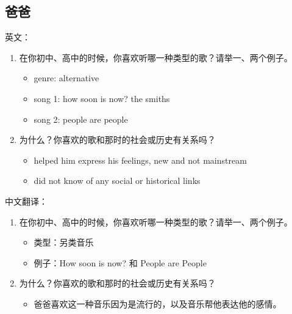 \documentclass[11pt]{article}
\begin{document}
\subsection{爸爸}
\label{sec:org5ee2cbc}
英文：
\begin{enumerate}
\item 在你初中、高中的时候，你喜欢听哪一种类型的歌？请举一、两个例子。
\begin{itemize}
\item genre: alternative
\item song 1: how soon is now? the smiths
\item song 2: people are people
\end{itemize}
\item 为什么？你喜欢的歌和那时的社会或历史有关系吗？
\begin{itemize}
\item helped him express his feelings, new and not mainstream
\item did not know of any social or historical links
\end{itemize}
\end{enumerate}
中文翻译：
\begin{enumerate}
\item 在你初中、高中的时候，你喜欢听哪一种类型的歌？请举一、两个例子。
\begin{itemize}
\item 类型：另类音乐
\item 例子：How soon is now? 和 People are People
\end{itemize}
\item 为什么？你喜欢的歌和那时的社会或历史有关系吗？
\begin{itemize}
\item 爸爸喜欢这一种音乐因为是流行的，以及音乐帮他表达他的感情。
\end{itemize}
\end{enumerate}
\end{document}
